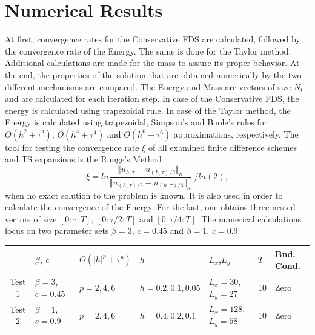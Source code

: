 \documentclass[%
 aip,
cp,  %
 amsmath,amssymb,%
 reprint,%
]{revtex4-2}
\begin{document}
\section{Numerical Results}

At first, convergence rates for the Conservative FDS are calculated, followed by the convergence rate of the Energy. The same is done for the Taylor method. Additional calculations are made for the mass to assure its proper behavior. At the end, the properties of the solution that are obtained numerically by the two different mechanisms are compared. The Energy and Mass are vectors of size $N_t$ and are calculated for each iteration step. In case of the Conservative FDS, the energy is calculated using trapezoidal rule. In case of the Taylor method, the Energy is calculated using trapezoidal, Simpson's and Boole's rules for $O(h^{2} + \tau^2 )$, $O(h^{4} + \tau^4 )$ and $O(h^{6} + \tau^6 )$ approximations, respectively. The tool for testing the convergence rate $\xi$ of all examined finite difference schemes and TS expansions is the Runge's Method
\begin{equation}\label{Runge}
\xi = ln  \frac{\Vert u_{h,\tau} - u_{(h,\tau)/2} \Vert_\kappa } {\Vert  u_{(h,\tau)/2} - u_{(h,\tau)/4} \Vert_\kappa  } | / ln(2),
\end{equation}
when no exact solution to the problem is known. It is also used in order to calculate the convergence of the Energy. For the last, one obtains three nested vectors of size $[0:\tau:T]$, $[0:\tau/2:T]$ and $[0:\tau/4:T]$. The numerical calculations focus on two parameter sets $\beta = 3$, $c=0.45$ and $\beta = 1$, $c=0.9$:

\begin{table}[H]
\centering
\small
		\begin{tabular}{||c|l|l|l|l|l|l||}
			\hline
			\hline
                                            &    $\beta$, $c$                              & $O(|h|^p + \tau^p)$   &      $h$                                & $L_x$,$L_y$                              & $T$      &  Bnd. Cond.   \\
   			\hline 
					\hline
           Test 1                        &      $\beta = 3$, $c=0.45$           &      $p=2, 4, 6$             &    $h=0.2, 0.1, 0.05$      & $L_x = 30$,$L_y=27$                &                10    &    Zero  \\
	   \hline
			\hline 
           Test 2                        &      $\beta = 1$, $c=0.9$             &      $p=2, 4, 6$             &     $h=0.4, 0.2, 0.1$       & $L_x = 128$,$L_y=58$                &               10    &   Zero  \\
	   \hline
			\hline 
		\end{tabular}

\end{table}
\end{document}
